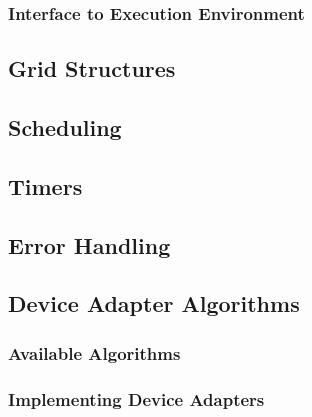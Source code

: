 

\subsubsection{Interface to Execution Environment}



\subsection{Grid Structures}
\label{sec:GridStructures}


\subsection{Scheduling}
\label{sec:Scheduling}


\subsection{Timers}
\label{sec:Timers}


\subsection{Error Handling}
\label{sec:ErrorHandling}


\subsection{Device Adapter Algorithms}
\label{sec:DeviceAdapterAlgorithms}

\subsubsection{Available Algorithms}


\subsubsection{Implementing Device Adapters}

